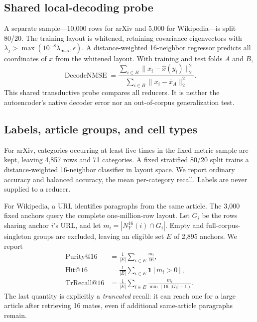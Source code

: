 \documentclass[10pt]{article}
\newcommand{\ind}{\mathbf{1}}
\begin{document}
\subsection{Shared local-decoding probe}

A separate sample---10,000 rows for arXiv and 5,000 for Wikipedia---is split 80/20.  The
training layout is whitened, retaining covariance eigenvectors with
$\lambda_j>\max(10^{-8}\lambda_{\max},\epsilon)$.  A distance-weighted 16-neighbor
regressor predicts all coordinates of $x$ from the whitened layout.  With training and
test folds $A$ and $B$,
\begin{equation}
 \operatorname{DecodeNMSE}
 =\frac{\sum_{i\in B}\|x_i-\widehat{x}(y_i)\|_2^2}
        {\sum_{i\in B}\|x_i-\bar{x}_A\|_2^2}.
\label{eq:decode}
\end{equation}
This shared transductive probe compares all reducers.  It is neither the autoencoder's
native decoder error nor an out-of-corpus generalization test.

\subsection{Labels, article groups, and cell types}

For arXiv, categories occurring at least five times in the fixed metric sample are kept,
leaving 4,857 rows and 71 categories.  A fixed stratified 80/20 split trains a
distance-weighted 16-neighbor classifier in layout space.  We report ordinary accuracy
and balanced accuracy, the mean per-category recall.  Labels are never supplied to a
reducer.

For Wikipedia, a URL identifies paragraphs from the same article.  The 3,000 fixed
anchors query the complete one-million-row layout.  Let $G_i$ be the rows sharing anchor
$i$'s URL, and let $m_i=|N_Y^{16}(i)\cap G_i|$.  Empty and full-corpus-singleton groups are
excluded, leaving an eligible set $E$ of 2,895 anchors.  We report
\begin{align}
 \operatorname{Purity@16}&=\frac1{|E|}\sum_{i\in E}\frac{m_i}{16},\\
 \operatorname{Hit@16}&=\frac1{|E|}\sum_{i\in E}\ind[m_i>0],\\
 \operatorname{TrRecall@16}&=\frac1{|E|}\sum_{i\in E}
       \frac{m_i}{\min(16,|G_i|-1)}.
 \label{eq:groups}
\end{align}
The last quantity is explicitly a \emph{truncated} recall: it can reach one for a large
article after retrieving 16 mates, even if additional same-article paragraphs remain.
\end{document}

